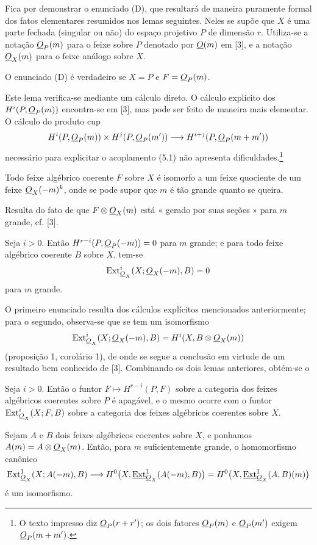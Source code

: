 Fica por demonstrar o enunciado (D), que resultará de maneira puramente formal dos fatos
elementares resumidos nos lemas seguintes. Neles se supõe que $X$ é uma
parte fechada (singular ou não) do espaço projetivo $P$ de dimensão $r$.
Utiliza-se a notação $\underline{O}_P(m)$ para o feixe sobre $P$ denotado por $\underline{O}(m)$ em
[3], e a notação $\underline{O}_X(m)$ para o feixe análogo sobre $X$.

 O enunciado (D) é verdadeiro se $X=P$ e $F=\underline{O}_P(m)$.

Este lema verifica-se mediante um cálculo direto. O cálculo explícito dos
$H^{i}(P,\underline{O}_P(m))$ encontra-se em [3], mas pode ser feito de maneira mais
elementar. O cálculo do produto cup
\[
  H^{i}(P,\underline{O}_P(m))\times H^{j}(P,\underline{O}_P(m'))
  \longrightarrow H^{i+j}(P,\underline{O}_P(m+m'))
\]
necessário para explicitar o acoplamento (5.1) não apresenta
dificuldades.\footnote{O texto impresso diz $\underline{O}_P(r+r')$; os dois fatores
$\underline{O}_P(m)$ e $\underline{O}_P(m')$ exigem $\underline{O}_P(m+m')$.}

 Todo feixe algébrico coerente $F$ sobre $X$ é isomorfo a
um feixe quociente de um feixe $\underline{O}_X(-m)^{k}$, onde se pode supor que $m$ é
tão grande quanto se queira.

Resulta do fato de que $F\otimes\underline{O}_X(m)$ está « gerado por suas seções » para
$m$ grande, cf. [3].

 Seja $i>0$. Então
$H^{r-i}(P,\underline{O}_P(-m))=0$ para $m$ grande; e para todo feixe algébrico
coerente $B$ sobre $X$, tem-se
\[
  \operatorname{Ext}_{\underline{O}_X}^{i}(X;\underline{O}_X(-m),B)=0
\]
para $m$ grande.

O primeiro enunciado resulta dos cálculos explícitos mencionados anteriormente; para o
segundo, observa-se que se tem um isomorfismo
\[
  \operatorname{Ext}_{\underline{O}_X}^{i}(X;\underline{O}_X(-m),B)
  =H^{i}(X,B\otimes\underline{O}_X(m))
\]
(proposição 1, corolário 1), de onde se segue a conclusão em virtude de um resultado bem
conhecido de [3]. Combinando os dois lemas anteriores, obtém-se o

 Seja $i>0$. Então o funtor
$F\longmapsto H^{r-i}(P,F)$ sobre a categoria dos feixes algébricos coerentes
sobre $P$ é apagável, e o mesmo ocorre com o funtor
$\operatorname{Ext}_{\underline{O}_X}^{i}(X;F,B)$ sobre a categoria dos feixes
algébricos coerentes sobre $X$.

 Sejam $A$ e $B$ dois feixes algébricos coerentes sobre
$X$, e ponhamos $A(m)=A\otimes\underline{O}_X(m)$. Então, para $m$ suficientemente grande,
o homomorfismo canônico
\[
  \operatorname{Ext}_{\underline{O}_X}^{1}(X;A(-m),B)
  \longrightarrow H^{0}\bigl(X,\underline{\operatorname{Ext}}_{\underline{O}_X}^{1}(A(-m),B)\bigr)
  =H^{0}\bigl(X,\underline{\operatorname{Ext}}_{\underline{O}_X}^{1}(A,B)(m)\bigr)
\]
é um isomorfismo.

